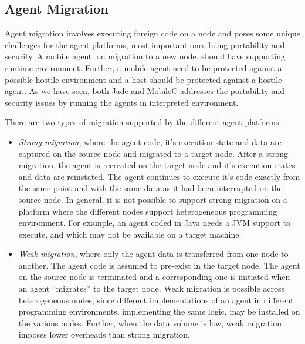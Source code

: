 \subsection{Agent Migration}

  
Agent migration involves executing foreign code on a node and poses some unique challenges for the agent platforms, most
important ones being portability and security. A mobile agent, on migration to a new node, should have supporting runtime
environment. Further, a mobile agent need to be protected against a possible hostile environment and a host should be
protected against a hostile agent. As we have seen, both Jade and MobileC addresses the portability and security issues by 
running the agents in interpreted environment.

There are two types of migration supported by the different agent platforms. 
\begin{itemize}
	\item {\em Strong migration}, where the agent code, it's execution state and data are captured on the source
		node and migrated to a target node. After a strong migration, the agent is recreated on the target
		node and it's execution states and data are reinstated. The agent continues to execute it's code exactly
		from the same point and with the same data as  it had been interrupted on the source node. In general,
		it is not possible to support strong migration on a platform where the different nodes support heterogeneous 
		programming environment. For example, an agent coded in Java needs a JVM support to execute, and which
		may not be available on a target machine. 
	\item {\em Weak migration}, where only the agent data is transferred from one node to another. The agent code is
		assumed to pre-exist in the target node. The agent on the source node is terminated and a corresponding one
		is initiated when an agent ``migrates'' to the target node. Weak migration is possible across heterogeneous
		nodes, since different implementations of an agent in different programming environments, implementing the
		same logic, may be installed on the various nodes. Further, when the data volume is low, weak migration 
		imposes lower overheads than strong migration.
\end{itemize}

